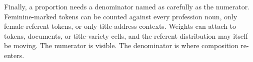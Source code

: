 Finally, a proportion needs a denominator named as carefully as the numerator. Feminine-marked tokens can be counted against every profession noun, only female-referent tokens, or only title-address contexts. Weights can attach to tokens, documents, or title-variety cells, and the referent distribution may itself be moving. The numerator is visible. The denominator is where composition re-enters.
